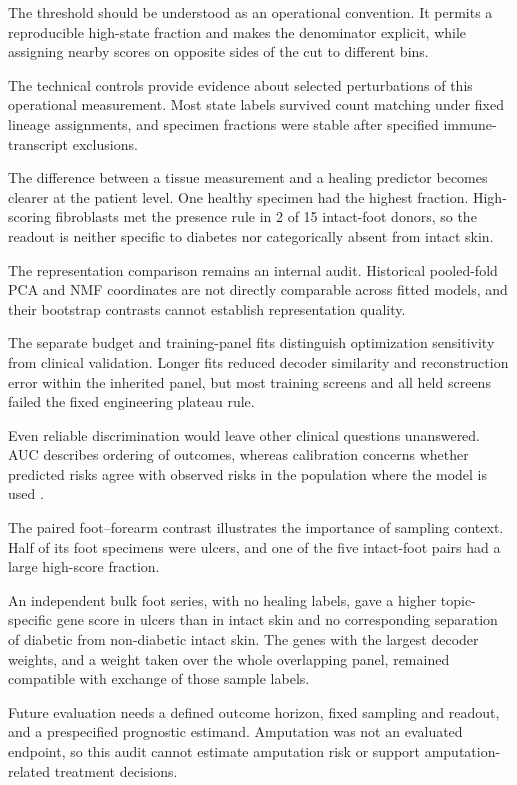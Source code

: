 \documentclass[10pt,a4paper]{article}
\begin{document}
The threshold should be understood as an operational convention. It permits a reproducible high-state fraction and makes the denominator explicit, while assigning nearby scores on opposite sides of the cut to different bins.

The technical controls provide evidence about selected perturbations of this operational measurement. Most state labels survived count matching under fixed lineage assignments, and specimen fractions were stable after specified immune-transcript exclusions.

The difference between a tissue measurement and a healing predictor becomes clearer at the patient level. One healthy specimen had the highest fraction. High-scoring fibroblasts met the presence rule in 2 of 15 intact-foot donors, so the readout is neither specific to diabetes nor categorically absent from intact skin.

The representation comparison remains an internal audit. Historical pooled-fold PCA and NMF coordinates are not directly comparable across fitted models, and their bootstrap contrasts cannot establish representation quality.

The separate budget and training-panel fits distinguish optimization sensitivity from clinical validation. Longer fits reduced decoder similarity and reconstruction error within the inherited panel, but most training screens and all held screens failed the fixed engineering plateau rule.

Even reliable discrimination would leave other clinical questions unanswered. AUC describes ordering of outcomes, whereas calibration concerns whether predicted risks agree with observed risks in the population where the model is used \citep{steyerberg2010,vancalster2019}.

The paired foot--forearm contrast illustrates the importance of sampling context. Half of its foot specimens were ulcers, and one of the five intact-foot pairs had a large high-score fraction.

An independent bulk foot series, with no healing labels, gave a higher topic-specific gene score in ulcers than in intact skin and no corresponding separation of diabetic from non-diabetic intact skin. The genes with the largest decoder weights, and a weight taken over the whole overlapping panel, remained compatible with exchange of those sample labels.

Future evaluation needs a defined outcome horizon, fixed sampling and readout, and a prespecified prognostic estimand. Amputation was not an evaluated endpoint, so this audit cannot estimate amputation risk or support amputation-related treatment decisions.
\end{document}
